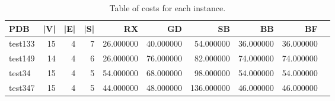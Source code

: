\begin{table}
\caption{Table of costs for each instance.}
\label{tab:costs}
\begin{tabular}{lrrrrrrrrr}
\toprule
PDB & |V| & |E| & |S| & RX & GD & SB & BB & BF \\
\midrule
test133 & 15 & 4 & 7 & 26.000000 & 40.000000 & 54.000000 & 36.000000 & 36.000000 \\
test149 & 14 & 4 & 6 & 26.000000 & 76.000000 & 82.000000 & 74.000000 & 74.000000 \\
test34 & 15 & 4 & 5 & 54.000000 & 68.000000 & 98.000000 & 54.000000 & 54.000000 \\
test347 & 15 & 4 & 5 & 44.000000 & 48.000000 & 136.000000 & 46.000000 & 46.000000 \\
\bottomrule
\end{tabular}
\end{table}

